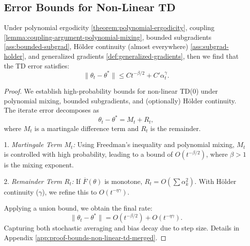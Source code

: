 \subsection{Error Bounds for Non-Linear TD}

\begin{theorem}
\label{theorem:bounds-non-linear-td}
Under polynomial ergodicity \ref{theorem:polynomial-ergodicity}, coupling \ref{lemma:coupling-argument-polynomial-mixing}, bounded subgradients \ref{ass:bounded-subgrad}, Hölder continuity (almost everywhere) \ref{ass:subgrad-holder}, and generalized gradients \ref{def:generalized-gradients}, then we find that the TD error satisfies:
\[
\| \theta_t - \theta^* \| \leq C t^{-\beta/2} + C' \alpha_t^\gamma.
\]
\end{theorem}

\begin{proof}
We establish high-probability bounds for non-linear TD(0) under polynomial mixing, bounded subgradients, and (optionally) H\"older continuity. The iterate error decomposes as
\[
\theta_t - \theta^* = M_t + R_t,
\]
where \(M_t\) is a martingale difference term and \(R_t\) is the remainder.

1. \emph{Martingale Term \(M_t\):} Using Freedman’s inequality and polynomial mixing, \(M_t\) is controlled with high probability, leading to a bound of \(O(t^{-\beta/2})\), where \(\beta > 1\) is the mixing exponent.

2. \emph{Remainder Term \(R_t\):} If \(\overline{F}(\theta)\) is monotone, \(R_t = O(\sum \alpha_k^2)\). With H\"older continuity (\(\gamma\)), we refine this to \(O(t^{-\eta\gamma})\).

Applying a union bound, we obtain the final rate:
\[
\|\theta_t - \theta^*\| = O(t^{-\beta/2}) + O(t^{-\eta\gamma}).
\]
Capturing both stochastic averaging and bias decay due to step size. Details in Appendix \ref{app:proof-bounds-non-linear-td-merged}.
\end{proof}
